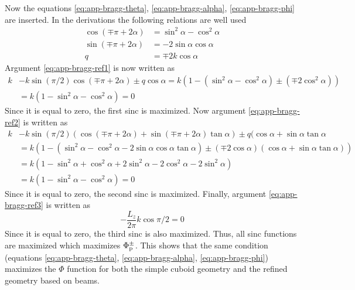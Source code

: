 \documentclass[11pt,twoside]{eitExjobb}
\begin{document}
Now the equations \eqref{eq:app-bragg-theta}, \eqref{eq:app-bragg-alpha}, \eqref{eq:app-bragg-phi} are inserted. In the derivations the following relations are well used
\begin{align*}
	\cos(\mp \pi + 2\alpha) &= \sin^2{\alpha} - \cos^2{\alpha} \\
	\sin(\mp \pi + 2\alpha) &= -2\sin{\alpha}\cos{\alpha} \\
	q &= \mp 2k\cos{\alpha}
\end{align*}
Argument \eqref{eq:app-bragg-ref1} is now written as
\begin{equation*}
\begin{split}
	k &- k\sin(\pi/2)\cos(\mp \pi + 2\alpha) \pm q\cos{\alpha} = k \left( 1 - (\sin^2{\alpha} - \cos^2{\alpha}) \pm (\mp 2\cos^2{\alpha}) \right) \\
	&= k \left( 1 - \sin^2{\alpha} - \cos^2{\alpha} \right) = 0
\end{split}
\end{equation*}
Since it is equal to zero, the first sinc is maximized. Now argument \eqref{eq:app-bragg-ref2} is written as
\begin{equation*}
\begin{split}
	k &- k\sin(\pi/2)(\cos(\mp \pi + 2\alpha) + \sin(\mp \pi + 2\alpha)\tan{\alpha}) \pm q(\cos{\alpha} + \sin{\alpha}\tan{\alpha} \\
	&= k \left( 1 - (\sin^2{\alpha} - \cos^2{\alpha} - 2\sin{\alpha}\cos{\alpha}\tan{\alpha}) \pm (\mp 2\cos{\alpha})(\cos{\alpha} + \sin{\alpha}\tan{\alpha}) \right) \\
	&= k \left( 1 - \sin^2{\alpha} + \cos^2{\alpha} + 2\sin^2{\alpha} - 2\cos^2{\alpha} - 2\sin^2{\alpha} \right) \\
	&= k \left( 1 - \sin^2{\alpha} - \cos^2{\alpha} \right) = 0
\end{split}
\end{equation*}
Since it is equal to zero, the second sinc is maximized. Finally, argument \eqref{eq:app-bragg-ref3} is written as
\begin{equation*}
	-\frac{L_{z}}{2\pi} k\cos{\pi/2} = 0
\end{equation*}
Since it is equal to zero, the third sinc is also maximized. Thus, all sinc functions are maximized which maximizes $\Phi_{\mathrm{p}}^{\pm}$. This shows that the same condition (equations \eqref{eq:app-bragg-theta}, \eqref{eq:app-bragg-alpha}, \eqref{eq:app-bragg-phi}) maximizes the $\Phi$ function for both the simple cuboid geometry and the refined geometry based on beams.
\end{document}
